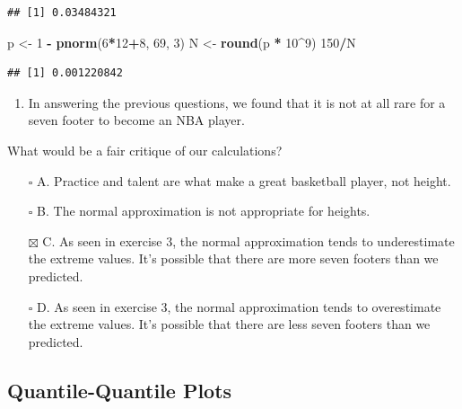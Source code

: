\documentclass[
]{article}
\newenvironment{Shaded}{\begin{snugshade}}{\end{snugshade}}
\newcommand{\DecValTok}[1]{\textcolor[rgb]{0.00,0.00,0.81}{#1}}
\newcommand{\KeywordTok}[1]{\textcolor[rgb]{0.13,0.29,0.53}{\textbf{#1}}}
\newcommand{\NormalTok}[1]{#1}
\newcommand{\OperatorTok}[1]{\textcolor[rgb]{0.81,0.36,0.00}{\textbf{#1}}}
\newcommand{\StringTok}[1]{\textcolor[rgb]{0.31,0.60,0.02}{#1}}
\providecommand{\tightlist}{%
  \setlength{\itemsep}{0pt}\setlength{\parskip}{0pt}}
\begin{document}
\begin{verbatim}
## [1] 0.03484321
\end{verbatim}

\begin{Shaded}
\begin{Highlighting}[]
\NormalTok{p <-}\StringTok{ }\DecValTok{1} \OperatorTok{-}\StringTok{ }\KeywordTok{pnorm}\NormalTok{(}\DecValTok{6}\OperatorTok{*}\DecValTok{12}\OperatorTok{+}\DecValTok{8}\NormalTok{, }\DecValTok{69}\NormalTok{, }\DecValTok{3}\NormalTok{)}
\NormalTok{N <-}\StringTok{ }\KeywordTok{round}\NormalTok{(p }\OperatorTok{*}\StringTok{ }\DecValTok{10}\OperatorTok{^}\DecValTok{9}\NormalTok{)}
\DecValTok{150}\OperatorTok{/}\NormalTok{N}
\end{Highlighting}
\end{Shaded}

\begin{verbatim}
## [1] 0.001220842
\end{verbatim}

\begin{enumerate}
\def\labelenumi{\arabic{enumi}.}
\setcounter{enumi}{7}
\tightlist
\item
  In answering the previous questions, we found that it is not at all
  rare for a seven footer to become an NBA player.
\end{enumerate}

What would be a fair critique of our calculations?

\begin{itemize}
\tightlist
\item[$\square$]
  A. Practice and talent are what make a great basketball player, not
  height.
\item[$\square$]
  B. The normal approximation is not appropriate for heights.
\item[$\boxtimes$]
  C. As seen in exercise 3, the normal approximation tends to
  underestimate the extreme values. It's possible that there are more
  seven footers than we predicted.
\item[$\square$]
  D. As seen in exercise 3, the normal approximation tends to
  overestimate the extreme values. It's possible that there are less
  seven footers than we predicted.
\end{itemize}

\hypertarget{quantile-quantile-plots}{%
\subsection{Quantile-Quantile Plots}\label{quantile-quantile-plots}}
\end{document}

